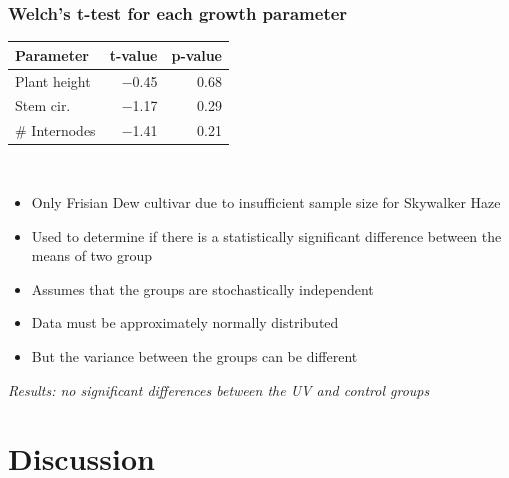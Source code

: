 \documentclass[
    12pt,
    aspectratio=1610,
    b,
    bibliography=../bibliography.bib,
    link-citations]{beamer}
\begin{document}
    \begin{frame}
        \frametitle{Welch's t-test for each growth parameter}
        \footnotesize
        \begin{tabular}{lrr}
            Parameter & t-value & p-value \\
            \midrule
            Plant height & \num[mode=text]{-0.45} & \num[mode=text]{0.68} \\
            Stem cir. & \num[mode=text]{-1.17} & \num[mode=text]{0.29} \\
            \# Internodes & \num[mode=text]{-1.41} & \num[mode=text]{0.21} \\
        \end{tabular} \\
        \vfill
        \begin{itemize}
            \item Only Frisian Dew cultivar due to insufficient sample size for Skywalker Haze
            \item Used to determine if there is a statistically significant difference between the means of two group
            \item Assumes that the groups are stochastically independent
            \item Data must be approximately normally distributed
            \item But the variance between the groups can be different
        \end{itemize}
        \em{Results: no significant differences between the UV and control groups}
    \end{frame}

    \section{Discussion}
\end{document}
